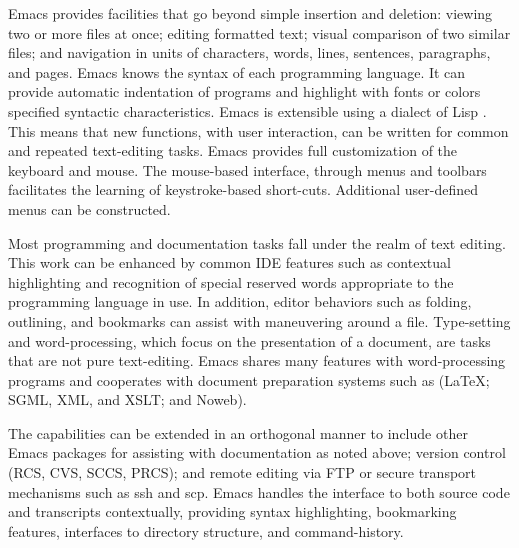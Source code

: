 \documentclass{article}
\newcommand*{\XLispStat}{\textsc{XLispStat}}
\newcommand{\stexttt}[1]{{\small\texttt{#1}}}
\newcommand{\file}[1]{`\stexttt{#1}'}
\begin{document}
Emacs provides facilities that go beyond simple insertion and
deletion: viewing two or more files at once; editing formatted text;
visual comparison of two similar files; and navigation in units of
characters, words, lines, sentences, paragraphs, and pages.  Emacs
knows the syntax of each programming language.  It can provide
automatic indentation of programs and highlight with fonts or colors
specified syntactic characteristics.  Emacs is extensible using a
dialect of Lisp \citep{RChassell1999,PGraham:1996}.  This means that
new functions, with user interaction, can be written for common and
repeated text-editing tasks.  Emacs provides full customization of the
keyboard and mouse.  The mouse-based interface, through menus and
toolbars facilitates the learning of keystroke-based short-cuts.
Additional user-defined menus can be constructed.

Most programming and documentation tasks fall under the realm of text
editing.  This work can be enhanced by common IDE features such as
contextual highlighting and recognition of special reserved words
appropriate to the programming language in use.  In addition, editor
behaviors such as folding, outlining, and bookmarks can assist with
maneuvering around a file.  Type-setting and word-processing, which
focus on the presentation of a document, are tasks that are not pure
text-editing.  Emacs shares many features with word-processing
programs and cooperates with document preparation systems such as
(\LaTeX; SGML, XML, and XSLT; and Noweb).

The capabilities can be extended in an orthogonal manner to include
other Emacs packages for assisting with documentation as noted above;
version control (RCS, CVS, SCCS, PRCS); and remote editing via FTP or
secure transport mechanisms such as ssh and scp.  Emacs handles the
interface to both source code and transcripts contextually, providing
syntax highlighting, bookmarking features, interfaces to directory
structure, and command-history.

\end{document}
